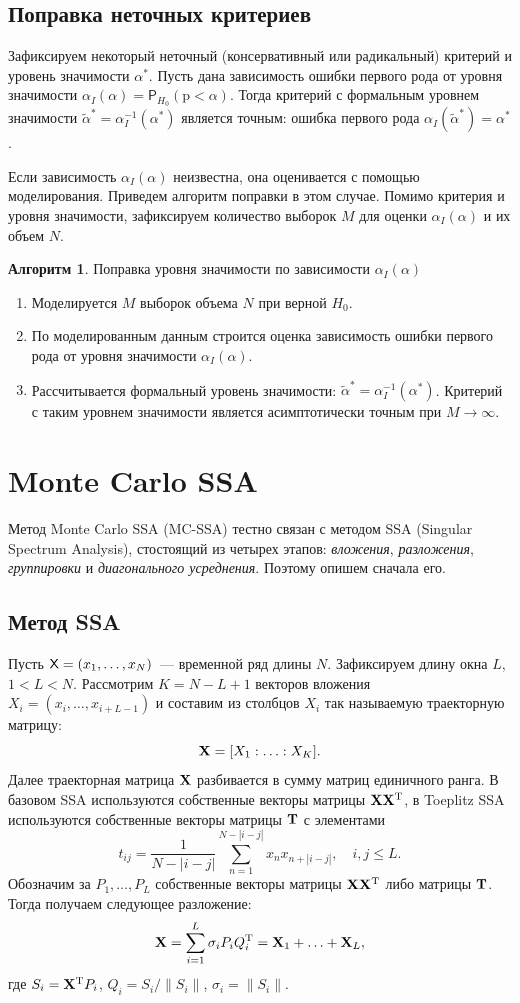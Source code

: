 \documentclass[specialist,
substylefile = spbu_report.rtx,
subf,href,colorlinks=true, 12pt]{disser}
\theoremstyle{definition}
\newtheorem{algorithm}{Алгоритм}
\begin{document}
\subsection{Поправка неточных критериев}\label{sect:correction}
Зафиксируем некоторый неточный (консервативный или радикальный) критерий и уровень значимости $\alpha^*$. Пусть дана зависимость ошибки первого рода от уровня значимости $\alpha_I(\alpha)=\mathsf P_{H_0}(\mathrm p < \alpha)$. Тогда критерий с формальным уровнем значимости $\widetilde\alpha^*=\alpha_I^{-1}(\alpha^*)$ является точным: ошибка первого рода $\alpha_I(\widetilde\alpha^*)=\alpha^*$.

Если зависимость $\alpha_I(\alpha)$ неизвестна, она оценивается с помощью моделирования. Приведем алгоритм поправки в этом случае. Помимо критерия и уровня значимости, зафиксируем количество выборок $M$ для оценки $\alpha_I(\alpha)$ и их объем $N$.
\begin{algorithm}{Поправка уровня значимости по зависимости $\alpha_I(\alpha)$}~\cite{Larin2022}\label{alg:correction}
	\begin{enumerate}
		\item Моделируется $M$ выборок объема $N$ при верной $H_0$.
		\item По моделированным данным строится оценка зависимость ошибки первого рода от уровня значимости $\alpha_I(\alpha)$.
		\item Рассчитывается формальный уровень значимости: $\widetilde{\alpha}^*=\alpha_I^{-1}(\alpha^*)$. Критерий с таким уровнем значимости является асимптотически точным при $M\to\infty$.
	\end{enumerate}
\end{algorithm}

\section{Monte Carlo SSA}
Метод Monte Carlo SSA (MC-SSA) тестно связан с методом SSA (Singular Spectrum Analysis), стостоящий из четырех этапов: \emph{вложения}, \emph{разложения}, \emph{группировки} и \emph{диагонального усреднения}. Поэтому опишем сначала его.
\subsection{Метод SSA}
Пусть $\mathsf{X}=(x_1,\ldots,x_N)$~--- временной ряд длины $N$. Зафиксируем длину окна $L$, $1<L<N$. Рассмотрим $K=N-L+1$ векторов вложения $X_i=(x_i,\ldots,x_{i+L-1})$ и составим из столбцов $X_i$ так называемую траекторную матрицу:
\[
	\mathbf{X} = [X_1:\ldots:X_K].
\]
Далее траекторная матрица $\mathbf{X}$ разбивается в сумму матриц единичного ранга. В базовом SSA используются собственные векторы матрицы $\mathbf{X}\mathbf{X}^{\mathrm{T}}$, в Toeplitz SSA используются собственные векторы матрицы $\mathbf{T}$ с элементами
\begin{equation}\label{eq:toeplitz}
	t_{ij} = \frac{1}{N - |i - j|}\sum_{n=1}^{N - |i - j|}x_n x_{n+|i-j|},\quad i,j\leqslant L.
\end{equation}
Обозначим за $P_1,\ldots,P_L$ собственные векторы матрицы $\mathbf{X}\mathbf{X}^{\mathrm{T}}$ либо матрицы $\mathbf{T}$. Тогда получаем следующее разложение:
\[
	\mathbf{X} = \sum_{i=1}^L \sigma_i P_i Q_i^{\mathrm{T}} = \mathbf{X}_1+\ldots+\mathbf{X}_L,
\]
где $S_i=\mathbf{X}^{\mathrm{T}} P_i$, $Q_i=S_i/\|S_i\|$, $\sigma_i=\|S_i\|$.
\end{document}
